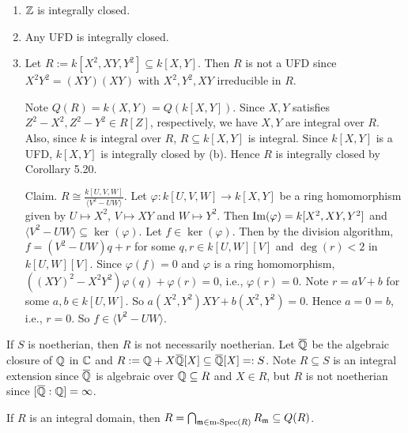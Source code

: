 \begin{example}
    \begin{enumerate}
        \item $\mathbb{Z}$ is integrally closed.
        \item Any UFD is integrally closed.
        \item Let $R := k[X^{2},XY,Y^{2}] \subseteq k[X,Y]$. Then $R$ is not a UFD since $X^{2}Y^{2} = (XY)(XY)$ with $X^{2},Y^{2},XY$ irreducible in $R$. \par 
            Note $Q(R) = k(X,Y) = Q(k[X,Y])$. Since $X,Y$ satisfies $Z^{2}-X^{2},Z^{2}-Y^{2} \in R[Z]$, respectively, we have $X,Y$ are integral over $R$. Also, since $k$ is integral over $R$, $R \subseteq k[X,Y]$ is integral. Since $k[X,Y]$ is a UFD, $k[X,Y]$ is integrally closed by (b). Hence $R$ is integrally closed by Corollary 5.20. \par 
            Claim. $R \cong \frac{k[U,V,W]}{\langle V^{2}-UW \rangle}$. Let $\varphi: k[U,V,W] \to k[X,Y]$ be a ring homomorphism given by $U \mapsto X^{2}$, $V \mapsto XY$ and $W \mapsto Y^{2}$. Then $\operatorname{Im}(\varphi) = k[X^{2},XY,Y^{2}]$ and $\langle V^{2}-UW \rangle \subseteq \ker(\varphi)$. Let $f \in \ker(\varphi)$. Then by the division algorithm, $f = (V^{2}-UW)q + r$ for some $q,r \in k[U,W][V]$ and $\deg(r) < 2$ in $k[U,W][V]$. Since $\varphi(f) = 0$ and $\varphi$ is a ring homomorphism, $((XY)^{2}-X^{2}Y^{2})\varphi(q) + \varphi(r)=0$, i.e., $\varphi(r) = 0$. Note $r = aV+b$ for some $a,b\in k[U,W]$. So $a(X^{2},Y^{2})XY + b(X^{2},Y^{2}) = 0$. Hence $a= 0 = b$, i.e., $r = 0$. So $f \in \langle V^{2}-UW \rangle$. 
    \end{enumerate}
\end{example}

\begin{example*}
    If $S$ is noetherian, then $R$ is not necessarily noetherian. Let $\overbar{\bbQ}$ be the algebraic closure of $\mathbb{Q}$ in $\mathbb{C}$ and $R := \bbQ + X \overbar{\bbQ}[X] \subseteq \overbar{\bbQ}[X] =: S$. Note $R \subseteq S$ is an integral extension since $\overbar{\bbQ}$ is algebraic over $\mathbb{Q} \subseteq R$ and $X \in R$, but $R$ is not noetherian since $[\overbar{\bbQ}:\bbQ] = \infty$.
\end{example*}

\begin{lemma}
    If $R$ is an integral domain, then $R = \bigcap_{\mathfrak{m} \in \operatorname{m-Spec}(R)} R_{\mathfrak{m}} \subseteq Q(R)$. 
\end{lemma}

